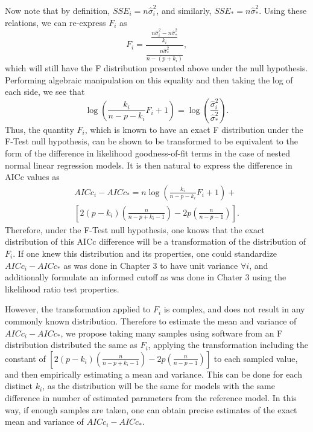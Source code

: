 Now note that by definition, $SSE_i = n \hat{\sigma}^2_i$, and similarly, $SSE_* = n \hat{\sigma}^2_*$. Using these relations, we can re-express
$F_i$ as
\begin{equation*}
	F_i = \frac{\frac{n \hat{\sigma}^2_i - n \hat{\sigma}^2_*}{k_i}}{\frac{n \hat{\sigma}^2_*}{n-(p+k_i)}} ,
\end{equation*}
which will still have the F distribution presented above under the null hypothesis. Performing algebraic manipulation on this equality and
then taking the log of each side, we see that
\begin{equation*}
	\log \left( \frac{k_i}{n-p-k_i} F_i + 1 \right) = \log \left( \frac{\hat{\sigma}^2_i}{\hat{\sigma}^2_*} \right) .
\end{equation*}
Thus, the quantity $F_i$, which is known to have an exact F distribution under the F-Test null hypothesis, can be shown to be transformed to
be equivalent to the form of the difference in likelihood goodness-of-fit terms in the case of nested normal linear regression models.
It is then natural to express the difference in AICc values as
\begin{equation*}
	\begin{split}
	AICc_i - AICc_* = n \log \left( \frac{k_i}{n-p-k_i} F_i + 1 \right) + \\
	\left[ 2(p-k_i) \left( \frac{n}{n-p+k_i-1} \right) - 2p \left( \frac{n}{n-p-1} \right) \right] .
	\end{split}
\end{equation*}
Therefore, under the F-Test null hypothesis, one knows that the exact distribution of this AICc difference will be a transformation of the
distribution of $F_i$. If one knew this distribution and its properties, one could standardize $AICc_i - AICc_*$ as was done in Chapter 3
to have unit variance $\forall i$, and additionally formulate an informed cutoff as was done in Chater 3 using the likelihood ratio
test properties.

However, the transformation applied to $F_i$ is complex, and does not result in any commonly known distribution. Therefore to estimate
the mean and variance of $AICc_i - AICc_*$, we propose taking many samples using software from an F distribution distributed the same as $F_i$,
applying the transformation including the constant of $\left[ 2(p-k_i) \left( \frac{n}{n-p+k_i-1} \right) - 2p \left( \frac{n}{n-p-1} \right) \right]$ to each sampled value,
and then empirically estimating a mean and variance. This can be done for each distinct $k_i$, as the distribution will be the same for models with
the same difference in number of estimated parameters from the reference model. In this way, if enough samples are taken, one can obtain precise estimates
of the exact mean and variance of $AICc_i - AICc_*$.

